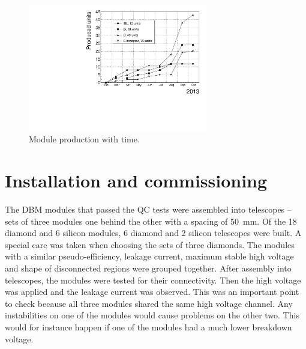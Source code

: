 \begin{figure}[!t]
\centering
\includegraphics[width=0.7\textwidth]{../scripts/04_charge_monitoring/plots/production}
\caption{Module production with time.}
\label{fig:production}
\end{figure}



















\section{Installation and commissioning}
\label{sec:install}

The DBM modules that passed the QC tests were assembled into telescopes -- sets of three modules one behind the other with a spacing of 50~mm. Of the 18 diamond and 6 silicon modules, 6 diamond and 2 silicon telescopes were built. A special care was taken when choosing the sets of three diamonds. The modules with a similar pseudo-efficiency, leakage current, maximum stable high voltage and shape of disconnected regions were grouped together. After assembly into telescopes, the modules were tested for their connectivity. Then the high voltage was applied and the leakage current was observed. This was an important point to check because all three modules shared the same high voltage channel. Any instabilities on one of the modules would cause problems on the other two. This would for instance happen if one of the modules had a much lower breakdown voltage.


